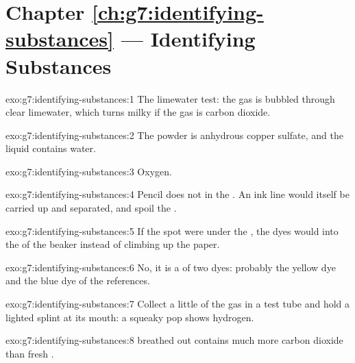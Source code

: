 \section*{Chapter \ref{ch:g7:identifying-substances} --- Identifying Substances}

\begin{solution}{exo:g7:identifying-substances:1}
The limewater test: the gas is bubbled through clear limewater, which
turns milky if the gas is carbon dioxide.
\end{solution}

\begin{solution}{exo:g7:identifying-substances:2}
The powder is anhydrous copper sulfate, and the liquid contains water.
\end{solution}

\begin{solution}{exo:g7:identifying-substances:3}
Oxygen.
\end{solution}

\begin{solution}{exo:g7:identifying-substances:4}
Pencil does not  in the . An ink line would itself be
carried up and separated, and spoil the .
\end{solution}

\begin{solution}{exo:g7:identifying-substances:5}
If the spot were under the , the dyes would  into the
 of the beaker instead of climbing up the paper.
\end{solution}

\begin{solution}{exo:g7:identifying-substances:6}
No, it is a  of two dyes: probably the yellow dye and the blue
dye of the references.
\end{solution}

\begin{solution}{exo:g7:identifying-substances:7}
Collect a little of the gas in a test tube and hold a lighted splint at
its mouth: a squeaky pop shows hydrogen.
\end{solution}

\begin{solution}{exo:g7:identifying-substances:8}
 breathed out contains much more carbon dioxide than fresh .
\end{solution}

